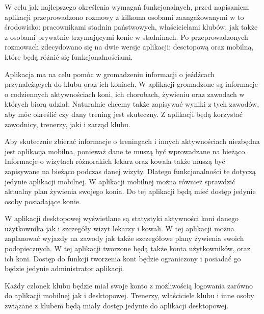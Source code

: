 \documentclass[12pt,twoside]{report}
\begin{document}
W celu jak najlepszego określenia wymagań funkcjonalnych, przed napisaniem aplikacji przeprowadzono rozmowy z kilkoma osobami zaangażowanymi w to środowisko: pracownikami stadnin państwowych, właścicielami klubów, jak także z osobami prywatnie trzymającymi konie w stadninach. Po przeprowadzonych rozmowach zdecydowano się na dwie wersje aplikacji: desctopową oraz mobilną, które będą różnić się funkcjonalnościami.

Aplikacja ma na celu pomóc w gromadzeniu informacji o jeźdźcach przynależących do klubu oraz ich koniach. W aplikacji gromadzone są informacje o codziennych aktywnościach koni, ich chorobach, żywieniu oraz zawodach w których biorą udział. Naturalnie chcemy także zapisywać wyniki z tych zawodów, aby móc określić czy dany trening jest skuteczny. Z aplikacji będą korzystać zawodnicy, trenerzy, jaki i zarząd klubu.

Aby skutecznie zbierać informacje o treningach i innych aktywnościach niezbędna jest aplikacja mobilna, ponieważ dane te muszą być wprowadzane na bieżąco. Informacje o wizytach różnorakich lekarz oraz kowala także muszą być zapisywane na bieżąco podczas danej wizyty. Dlatego funkcjonalności te dotyczą jedynie aplikacji mobilnej. W aplikacji mobilnej można również sprawdzić aktualny plan żywienia swojego konia. Do tej aplikacji będą mieć dostęp jedynie osoby posiadające konie. 

W aplikacji desktopowej wyświetlane są statystyki aktywności koni danego użytkownika jak i szczegóły wizyt lekarzy i kowali. W tej aplikacji można zaplanować wyjazdy na zawody jak także szczegółowe plany żywienia swoich podopiecznych. W tej aplikacji tworzone  będą także konta użytkowników, oraz ich koni. Dostęp do funkcji tworzenia kont będzie ograniczony i posiadać go będzie jedynie administrator aplikacji.

Każdy członek klubu będzie miał swoje konto z możliwością logowania zarówno do aplikacji mobilnej jak i desktopowej. Trenerzy, właściciele klubu i inne osoby związane z klubem będą miały dostęp jedynie do aplikacji desktopowej. 
\end{document}
